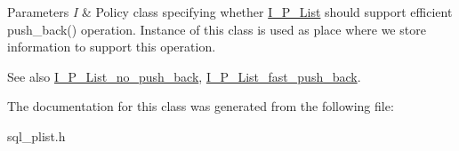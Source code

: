 \begin{DoxyParams}{Parameters}
{\em I} & Policy class specifying whether \mbox{\hyperlink{classI__P__List}{I\+\_\+\+P\+\_\+\+List}} should support efficient push\+\_\+back() operation. Instance of this class is used as place where we store information to support this operation. \\
\hline
\end{DoxyParams}
\begin{DoxySeeAlso}{See also}
\mbox{\hyperlink{classI__P__List__no__push__back}{I\+\_\+\+P\+\_\+\+List\+\_\+no\+\_\+push\+\_\+back}}, \mbox{\hyperlink{classI__P__List__fast__push__back}{I\+\_\+\+P\+\_\+\+List\+\_\+fast\+\_\+push\+\_\+back}}. 
\end{DoxySeeAlso}


The documentation for this class was generated from the following file\+:\begin{DoxyCompactItemize}
\item 
sql\+\_\+plist.\+h\end{DoxyCompactItemize}
